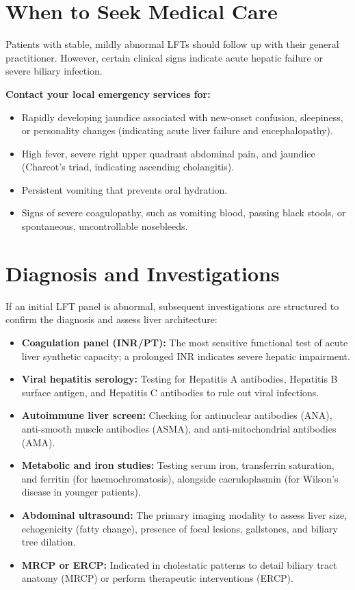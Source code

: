 \section*{When to Seek Medical Care}
Patients with stable, mildly abnormal LFTs should follow up with their general practitioner. However, certain clinical signs indicate acute hepatic failure or severe biliary infection.

\textbf{Contact your local emergency services for:}
\begin{itemize}
    \item Rapidly developing jaundice associated with new-onset confusion, sleepiness, or personality changes (indicating acute liver failure and encephalopathy).
    \item High fever, severe right upper quadrant abdominal pain, and jaundice (Charcot's triad, indicating ascending cholangitis).
    \item Persistent vomiting that prevents oral hydration.
    \item Signs of severe coagulopathy, such as vomiting blood, passing black stools, or spontaneous, uncontrollable nosebleeds.
\end{itemize}

\section*{Diagnosis and Investigations}
If an initial LFT panel is abnormal, subsequent investigations are structured to confirm the diagnosis and assess liver architecture:

\begin{itemize}
    \item \textbf{Coagulation panel (INR/PT):} The most sensitive functional test of acute liver synthetic capacity; a prolonged INR indicates severe hepatic impairment.
    \item \textbf{Viral hepatitis serology:} Testing for Hepatitis A antibodies, Hepatitis B surface antigen, and Hepatitis C antibodies to rule out viral infections.
    \item \textbf{Autoimmune liver screen:} Checking for antinuclear antibodies (ANA), anti-smooth muscle antibodies (ASMA), and anti-mitochondrial antibodies (AMA).
    \item \textbf{Metabolic and iron studies:} Testing serum iron, transferrin saturation, and ferritin (for haemochromatosis), alongside caeruloplasmin (for Wilson's disease in younger patients).
    \item \textbf{Abdominal ultrasound:} The primary imaging modality to assess liver size, echogenicity (fatty change), presence of focal lesions, gallstones, and biliary tree dilation.
    \item \textbf{MRCP or ERCP:} Indicated in cholestatic patterns to detail biliary tract anatomy (MRCP) or perform therapeutic interventions (ERCP).
\end{itemize}

